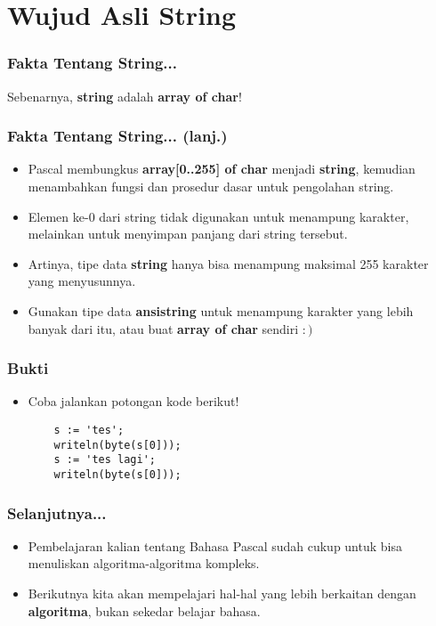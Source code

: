 \section{Wujud Asli String}
\frame{\sectionpage}

\begin{frame}
\frametitle{Fakta Tentang String...}
Sebenarnya, \textbf{string} adalah \textbf{\alert{array of char}}!
\end{frame}

\begin{frame}
\frametitle{Fakta Tentang String... (lanj.)}
\begin{itemize}
  \item Pascal membungkus \textbf{array[0..255] of char} menjadi \textbf{string}, kemudian menambahkan fungsi dan prosedur dasar untuk pengolahan string.
  \item Elemen ke-0 dari string tidak digunakan untuk menampung karakter, melainkan untuk menyimpan \alert{panjang dari string tersebut}.
  \item Artinya, tipe data \textbf{string} hanya bisa menampung maksimal 255 karakter yang menyusunnya.
  \item Gunakan tipe data \textbf{ansistring} untuk menampung karakter yang lebih banyak dari itu, atau buat \textbf{array of char} sendiri $:)$
\end{itemize}
\end{frame}

\begin{frame}[fragile]
\frametitle{Bukti}
\begin{itemize}
  \item Coba jalankan potongan kode berikut!
  \begin{lstlisting}
    s := 'tes';
    writeln(byte(s[0]));
    s := 'tes lagi';
    writeln(byte(s[0]));
  \end{lstlisting}
\end{itemize}
\end{frame}

\begin{frame}
\frametitle{Selanjutnya...}
\begin{itemize}
  \item Pembelajaran kalian tentang Bahasa Pascal sudah cukup untuk bisa menuliskan algoritma-algoritma kompleks.
  \item Berikutnya kita akan mempelajari hal-hal yang lebih berkaitan dengan \textbf{algoritma}, bukan sekedar belajar bahasa.
\end{itemize}
\end{frame}


